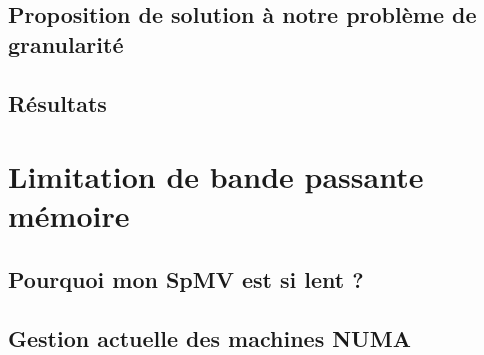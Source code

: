 \documentclass[oneside,12t]{classes/Thesis}
\begin{document}
\section{Proposition de solution à notre problème de granularité}






% 




\section{Résultats}









\chapter{Limitation de bande passante mémoire}
\minitoc
\vspace{1cm}

\section{Pourquoi mon SpMV est si lent ?}




\section{Gestion actuelle des machines NUMA}






\end{document}
